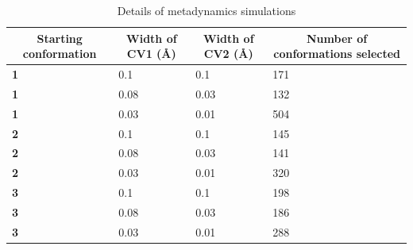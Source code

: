 \documentclass[../main.tex]{subfiles}
\begin{document}
            \begin{table}[]
            \centering
            \caption{Details of metadynamics simulations}
            \label{tab:metadyn-table}
            \begin{tabular}{|l|l|l|l|}
            \hline
            \multicolumn{1}{|c|}{{\textbf{Starting conformation}}} &
            \multicolumn{1}{c|}{{\textbf{Width of CV1 (\AA)}}} &
            \multicolumn{1}{c|}{{\textbf{Width of CV2 (\AA)}}} &
            \multicolumn{1}{c|}{{\textbf{Number of conformations selected}}} \\ \hline

            { \textbf{1}} & { {0.1}}  & { {0.1}}  & {{171}} \\ \hline

            { \textbf{1}} & { {0.08}} & { {0.03}} & { {132}} \\ \hline

            { \textbf{1}} & { {0.03}} & { {0.01}} & { {504}} \\ \hline

            { \textbf{2}} & { {0.1}}  & { {0.1}}  & { {145}} \\ \hline

            { \textbf{2}} & { {0.08}} & { {0.03}} & { {141}} \\ \hline

            { \textbf{2}} & { {0.03}} & { {0.01}} & { {320}} \\ \hline

            { \textbf{3}} & { {0.1}}  & { {0.1}}  & { {198}} \\ \hline

            { \textbf{3}} & { {0.08}} & { {0.03}} & { {186}} \\ \hline

            { \textbf{3}} & { {0.03}} & { {0.01}} & { {288}} \\ \hline
            \end{tabular}
            \end{table}
\end{document}
